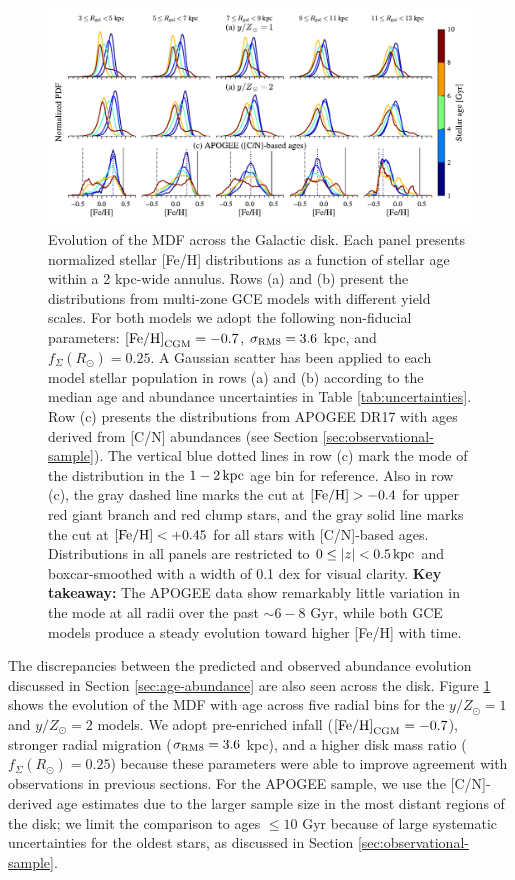 \documentclass[twocolumn,twocolappendix,linenumbers]{aastex631}
\newcommand{\mathFeH}{{\rm [Fe/H]}}
\newcommand{\yZ}[1]{$y/Z_\odot=#1$}
\newcommand{\kpc}{\,{\rm kpc}}
\begin{document}
\begin{figure}
    \centering
    \includegraphics[width=\linewidth]{figures/mdf_evolution.pdf}
    \caption{Evolution of the MDF across the Galactic disk. Each panel presents normalized stellar [Fe/H] distributions as a function of stellar age within a {2 kpc}-wide annulus. Rows (a) and (b) present the distributions from multi-zone GCE models with different yield scales. For both models we adopt the following non-fiducial parameters: $\mathFeH_{\rm CGM}=-0.7$, $\sigma_{\rm RM8}=3.6$ kpc, and $f_\Sigma(R_\odot)=0.25$. A Gaussian scatter has been applied to each model stellar population in rows (a) and (b) according to the median age and abundance uncertainties in Table \ref{tab:uncertainties}. Row (c) presents the distributions from APOGEE DR17 with ages derived from [C/N] abundances (see Section \ref{sec:observational-sample}). The vertical blue dotted lines in row (c) mark the mode of the distribution in the $1-2\kpc$ age bin for reference. Also in row (c), the gray dashed line marks the cut at $\mathFeH>-0.4$ for upper red giant branch and red clump stars, and the gray solid line marks the cut at $\mathFeH<+0.45$ for all stars with [C/N]-based ages. Distributions in all panels are restricted to $0\leq|z|<0.5\kpc$ and boxcar-smoothed with a width of {0.1 dex} for visual clarity. {\bf Key takeaway:} The APOGEE data show remarkably little variation in the mode at all radii over the past $\sim6-8$ Gyr, while both GCE models produce a steady evolution toward higher [Fe/H] with time.}
    \label{fig:mdf-evolution}
\end{figure}

The discrepancies between the predicted and observed abundance evolution discussed in Section \ref{sec:age-abundance} are also seen across the disk. Figure \ref{fig:mdf-evolution} shows the evolution of the MDF with age across five radial bins for the \yZ{1} and \yZ{2} models. We adopt pre-enriched infall ($\mathFeH_{\rm CGM}=-0.7$), stronger radial migration ($\sigma_{\rm RM8}=3.6$ kpc), and a higher disk mass ratio ($f_\Sigma(R_\odot)=0.25$) because these parameters were able to improve agreement with observations in previous sections. For the APOGEE sample, we use the [C/N]-derived age estimates due to the larger sample size in the most distant regions of the disk; we limit the comparison to ages $\leq10$ Gyr because of large systematic uncertainties for the oldest stars, as discussed in Section \ref{sec:observational-sample}. 
\end{document}
